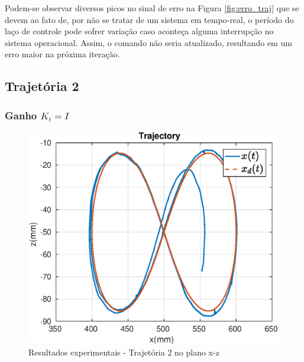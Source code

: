 Podem-se observar diversos picos no sinal de erro na Figura \ref{fig:erro_traj} que se devem ao fato de, por não se tratar de um sistema em tempo-real, o período do laço de controle pode sofrer variação caso aconteça alguma interrupção no sistema operacional. Assim, o comando não seria atualizado, resultando em um erro maior na próxima iteração.


\subsection{Trajetória 2}

\subsubsection{Ganho ${K}_t = {I}$}
\begin{figure}[H]
\centering
  \includegraphics[width=0.5\linewidth]{./img/traj_2_k1/traj.eps}
  \caption{Resultados experimentais - Trajetória 2 no plano x-z}
  \label{fig:sub1}
\end{figure}%

